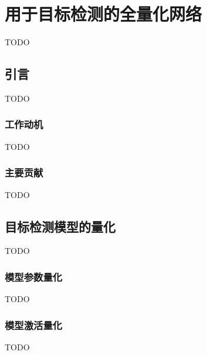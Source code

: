 \chapter{用于目标检测的全量化网络} \label{chap::fqn}
TODO

\section{引言}
TODO
\subsection{工作动机}
TODO
\subsection{主要贡献}
TODO

\section{目标检测模型的量化}
TODO
\subsection{模型参数量化}
TODO
\subsection{模型激活量化}
TODO
